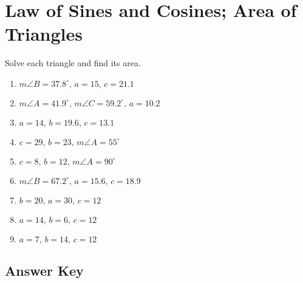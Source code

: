 \chapter{Law of Sines and Cosines; Area of Triangles}

Solve each triangle and find its area.

\begin{enumerate}
	\item $m\angle B = 37.8^\circ, \, a = 15, \, c = 21.1$
    \item $m\angle A = 41.9^\circ, \, m\angle C = 59.2^\circ, \, a = 10.2$
    \item $a = 14, \, b = 19.6, \, c = 13.1$
    
    \item $c = 29, \, b = 23, \, m\angle A = 55^\circ$
    \item $c = 8, \, b = 12, \, m\angle A = 90^\circ$
    \item $m\angle B = 67.2^\circ, \, a = 15.6, \, c = 18.9$
    
    \item $b = 20, \, a = 30, \, c = 12$
    \item $a = 14, \, b = 6, \, c = 12$
    \item $a = 7, \, b = 14, \, c = 12$
    
\end{enumerate}

\newpage

\section{Answer Key}

